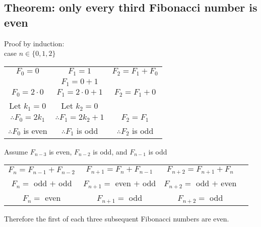 \documentclass[11pt, oneside]{article}   	%
\begin{document}
	\subsection{Theorem: only every third Fibonacci number is even}
		Proof by induction:\\
		case $n \in \{0, 1, 2\}$
		\begin{center}
		\begin{tabular}{c|c|c}
			$F_0 = 0$&$F_1 = 1$&$F_2 = F_1 + F_0$\\
			&$F_1 = 0 + 1$&\\
			$F_0 = 2\cdot 0$&$F_1 = 2\cdot0 + 1$&$F_2 =  F_1 + 0$\\
			Let $k_1 = 0$&Let $k_2 = 0$&\\
			$\therefore F_0 = 2k_1$&$\therefore F_1 = 2k_2 + 1$&$F_2 = F_1$\\
			$\therefore F_0$ is even&$\therefore F_1$ is odd&$\therefore F_2$ is odd\\
		\end{tabular}
		\end{center}
		Assume $F_{n - 3}$ is even, $F_{n - 2}$ is odd, and $F_{n - 1}$ is odd
		\begin{center}
		\begin{tabular}{c|c|c c}
			$F_n = F_{n - 1} + F_{n - 2}$&$F_{n+1} = F_n + F_{n - 1}$&$F_{n+2} = F_{n + 1} + F_n$\\
			$F_n =$ odd $+ $ odd&$F_{n+1} =$ even $+$ odd&$F_{n+ 2} =$ odd $+$ even\\
			$F_n =$ even&$F_{n+1} =$ odd& $F_{n+2} =$ odd
		\end{tabular}
		\end{center}
		Therefore the first of each three subsequent Fibonacci numbers are even.

\end{document}
